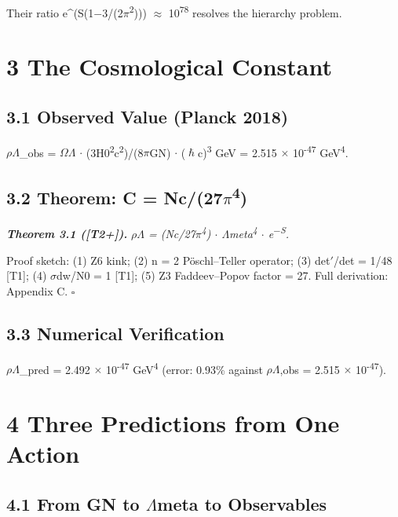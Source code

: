 \documentclass[11pt,letterpaper]{article}
\begin{document}
\noindent Their ratio e\textasciicircum{}(S(1$-$3/(2$\pi$\textsuperscript{2}))) $\approx$ 10\textsuperscript{78} resolves the hierarchy problem.

\section*{3  The Cosmological Constant}

\subsection*{3.1  Observed Value (Planck 2018)}

\begingroup\centering $\rho$$\Lambda$\_obs = $\Omega$$\Lambda$ $\cdot$ (3H0\textsuperscript{2}c\textsuperscript{2})/(8$\pi$GN) $\cdot$ ($\hslash$c)\textsuperscript{3} GeV = 2.515 $\times$ 10\textsuperscript{-47} GeV\textsuperscript{4}.\par\endgroup

\subsection*{3.2  Theorem: C = Nc/(27$\pi$\textsuperscript{4})}

\noindent \textbf{\textit{Theorem 3.1 ([T2+]). }}\textit{$\rho$$\Lambda$ = (Nc/27$\pi$\textsuperscript{4}) $\cdot$ $\Lambda$meta\textsuperscript{4} $\cdot$ e\textsuperscript{$-$S}.}

\noindent Proof sketch: (1) Z6 kink; (2) n = 2 Pöschl--Teller operator; (3) det$'$/det = 1/48 [T1]; (4) $\sigma$dw/N0 = 1 [T1]; (5) Z3 Faddeev--Popov factor = 27. Full derivation: Appendix C. $\square$

\subsection*{3.3  Numerical Verification}

\noindent $\rho$$\Lambda$\_pred = 2.492 $\times$ 10\textsuperscript{-47} GeV\textsuperscript{4} (error: 0.93\% against $\rho$$\Lambda$,obs = 2.515 $\times$ 10\textsuperscript{-47}).

\section*{4  Three Predictions from One Action}

\subsection*{4.1  From GN to $\Lambda$meta to Observables}
\end{document}
